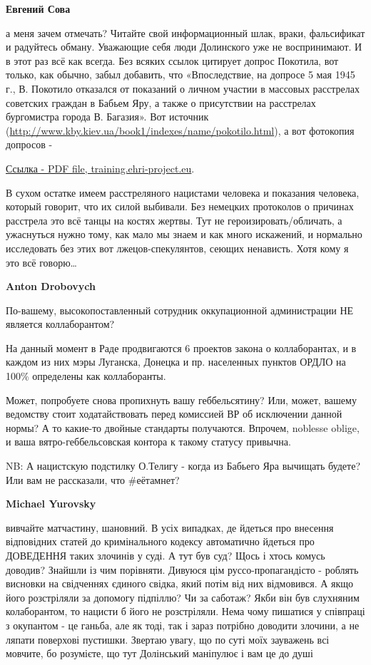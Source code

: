 \begin{itemize}
\begin{itemize}
\textbf{Евгений Сова} 

а меня зачем отмечать? Читайте свой информационный шлак, враки, фальсификат и
радуйтесь обману. Уважающие себя люди Долинского уже не воспринимают. И в этот
раз всё как всегда. Без всяких ссылок цитирует допрос Покотила, вот только, как
обычно, забыл добавить, что «Впоследствие, на допросе 5 мая 1945 г., В.
Покотило отказался от показаний о личном участии в массовых расстрелах
советских граждан в Бабьем Яру, а также о присутствии на расстрелах бургомистра
города В. Багазия». Вот источник
(\url{http://www.kby.kiev.ua/book1/indexes/name/pokotilo.html}), а вот фотокопия
допросов -

\href{https://training.ehri-project.eu/sites/training.ehri-project.eu/files/EHRI_Ua_C9_HDA_SBU_5-43555_ark_42–43_44–53_79–79zv_129–129zv.pdf}{Ссылка - PDF file, training.ehri-project.eu}.  

В сухом остатке имеем расстреляного нацистами человека и показания человека,
который говорит, что их силой выбивали. Без немецких протоколов о причинах
расстрела это всё танцы на костях жертвы. Тут не героизировать/обличать, а
ужаснуться нужно тому, как мало мы знаем и как много искажений, и нормально
исследовать без этих вот лжецов-спекулянтов, сеющих ненависть. Хотя кому я это
всё говорю…

\textbf{Anton Drobovych}

По-вашему, высокопоставленный сотрудник оккупационной администрации НЕ является
коллаборантом?

На данный момент в Раде продвигаются 6 проектов закона о коллаборантах, и в
каждом из них мэры Луганска, Донецка и пр. населенных пунктов ОРДЛО на 100\%
определены как коллаборанты.

Может, попробуете снова пропихнуть вашу геббельсятину? Или, может, вашему
ведомству стоит ходатайствовать перед комиссией ВР об исключении данной нормы?
А то какие-то двойные стандарты получаются. Впрочем, noblesse oblige, и ваша
вятро-геббельсовская контора к такому статусу привычна.

NB: А нацистскую подстилку О.Телигу - когда из Бабьего Яра вычищать будете? Или
вам не рассказали, что \#еётамнет?

\textbf{Michael Yurovsky} 

вивчайте матчастину, шановний. В усіх випадках, де йдеться про внесення
відповідних статей до кримінального кодексу автоматично йдеться про ДОВЕДЕННЯ
таких злочинів у суді. А тут був суд? Щось і хтось комусь доводив? Знайшли із
чим порівняти. Дивуюся цім руссо-пропагандісто - роблять висновки на свідченнях
єдиного свідка, який потім від них відмовився. А якщо його розстріляли за
допомогу підпіллю? Чи за саботаж? Якби він був слухняним колаборантом, то
нацисти б його не розстріляли. Нема чому пишатися у співпраці з окупантом - це
ганьба, але як тоді, так і зараз потрібно доводити злочини, а не ляпати
поверхові пустишки. Звертаю увагу, що по суті моїх зауважень всі мовчите, бо
розумієте, що тут Долінський маніпулює і вам це до душі


\end{itemize}
\end{itemize}
